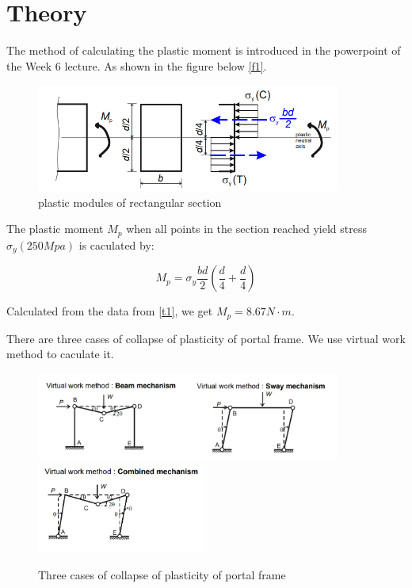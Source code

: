 \section{Theory}
\FloatBarrier %

The method of calculating the plastic moment is introduced in the powerpoint of the Week 6 lecture. As shown in the figure below \autoref{f1}.

\begin{figure}
    \centering
    \includegraphics[width=10cm]{./fig/11.png}
    \caption{plastic modules of rectangular section  }
    \label{f1}
\end{figure}

The plastic moment $M_p$ when all points in the section reached
yield stress $\sigma_y(250Mpa)$ is caculated by:

\begin{equation} 
    M_p=\sigma_y\frac{bd}{2}(\frac{d}{4}+\frac{d}{4})
    \label{e1}
\end{equation}

Calculated from the data from \autoref{t1}, we get $M_p=8.67N \cdot m$.

There are three cases of collapse of plasticity of portal frame. We use virtual work method to caculate it.

\begin{figure}[htbp]
    \centering
    \includegraphics[width=10cm]{./fig/12.png}
    \includegraphics[width=5.5cm]{./fig/13.png}
    \caption{Three cases of collapse of plasticity of portal frame}
    \label{f2}
\end{figure}


